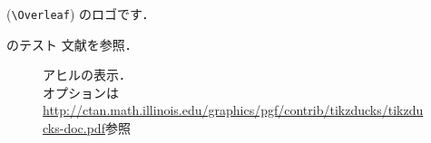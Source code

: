 \documentclass[
uplatex,%
Overleaf=true,%
dvipdfmx,%
b5ver_for_tokiyotosho/14Q,%
useotf,%
]{kbdbook9}
\begin{document}
\mainmatter
{\Overleaf} (\verb|\Overleaf|) のロゴです．


のテスト%
文献\cite{__2012}を参照．%

\begin{figure}
\centering
\OvlfDuck[speech=\textbf{Check!}]
\scalebox{0.5}{\OvlfDuck[think={\textsf{?}}]}%
\caption[]{アヒルの表示．\\
オプションは\url{http://ctan.math.illinois.edu/graphics/pgf/contrib/tikzducks/tikzducks-doc.pdf}参照}
\end{figure}
\scsnowman[hat=true,muffler=red,arms=true,scale=10]



\backmatter

\printindex
\end{document}
